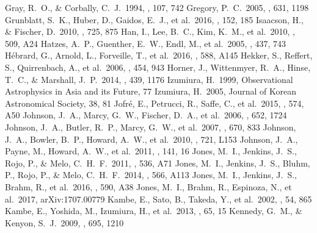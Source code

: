 \documentclass[]{pasj01}
\begin{document}
\begin{thebibliography}{}
Gray, R.~O., \& Corbally, C.~J.\ 1994, \aj, 107, 742 
Gregory, P.~C.\ 2005, \apj, 631, 1198 
Grunblatt, S.~K., Huber, D., Gaidos, E.~J., et al.\ 2016, \aj, 152, 185 
Isaacson, H., \& Fischer, D.\ 2010, \apj, 725, 875
Han, I., Lee, B.~C., Kim, K.~M., et al.\ 2010, \aap, 509, A24 
Hatzes, A.~P., Guenther, E.~W., Endl, M., et al.\ 2005, \aap, 437, 743 
H{\'e}brard, G., Arnold, L., Forveille, T., et al.\ 2016, \aap, 588, A145 
Hekker, S., Reffert, S., Quirrenbach, A., et al.\ 2006, \aap, 454, 943 
Horner, J., Wittenmyer, R.~A., Hinse, T.~C., \& Marshall, J.~P.\ 2014, \mnras, 439, 1176 
Izumiura, H.\ 1999, Observational Astrophysics in Asia and its Future, 77 
Izumiura, H.\ 2005, Journal of Korean Astronomical Society, 38, 81 
Jofr{\'e}, E., Petrucci, R., Saffe, C., et al.\ 2015, \aap, 574, A50 
Johnson, J.~A., Marcy, G.~W., Fischer, D.~A., et al.\ 2006, \apj, 652, 1724 
Johnson, J.~A., Butler, R.~P., Marcy, G.~W., et al.\ 2007, \apj, 670, 833 
Johnson, J.~A., Bowler, B.~P., Howard, A.~W., et al.\ 2010, \apjl, 721, L153
Johnson, J.~A., Payne, M., Howard, A.~W., et al.\ 2011, \aj, 141, 16 
Jones, M.~I., Jenkins, J.~S., Rojo, P., \& Melo, C.~H.~F.\ 2011, \aap, 536, A71 
Jones, M.~I., Jenkins, J.~S., Bluhm, P., Rojo, P., \& Melo, C.~H.~F.\ 2014, \aap, 566, A113 
Jones, M.~I., Jenkins, J.~S., Brahm, R., et al.\ 2016, \aap, 590, A38 
Jones, M.~I., Brahm, R., Espinoza, N., et al.\ 2017, arXiv:1707.00779 
Kambe, E., Sato, B., Takeda, Y., et al.\ 2002, \pasj, 54, 865 
Kambe, E., Yoshida, M., Izumiura, H., et al.\ 2013, \pasj, 65, 15
Kennedy, G.~M., \& Kenyon, S.~J.\ 2009, \apj, 695, 1210 

\end{thebibliography}
\end{document}

